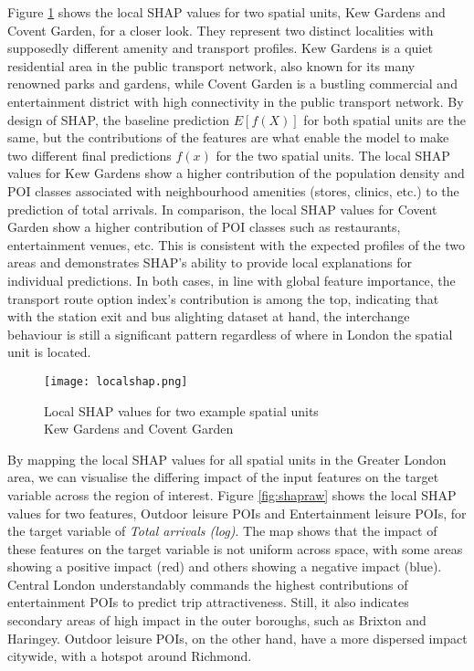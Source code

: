 Figure \ref{fig:localshap} shows the local SHAP values for two spatial units, Kew Gardens and Covent Garden, for a closer look. They represent two distinct localities with supposedly different amenity and transport profiles. Kew Gardens is a quiet residential area in the public transport network, also known for its many renowned parks and gardens, while Covent Garden is a bustling commercial and entertainment district with high connectivity in the public transport network. By design of SHAP, the baseline prediction $E[f(X)]$ for both spatial units are the same, but the contributions of the features are what enable the model to make two different final predictions $f(x)$ for the two spatial units. The local SHAP values for Kew Gardens show a higher contribution of the population density and POI classes associated with neighbourhood amenities (stores, clinics, etc.) to the prediction of total arrivals. In comparison, the local SHAP values for Covent Garden show a higher contribution of POI classes such as restaurants, entertainment venues, etc. This is consistent with the expected profiles of the two areas and demonstrates SHAP's ability to provide local explanations for individual predictions. In both cases, in line with global feature importance, the transport route option index's contribution is among the top, indicating that with the station exit and bus alighting dataset at hand, the interchange behaviour is still a significant pattern regardless of where in London the spatial unit is located.

\begin{figure}[!ht]
    \centering
    \texttt{[image: localshap.png]}
    \captionsetup{justification=centering}
    \caption{Local SHAP values for two example spatial units\\Kew Gardens and Covent Garden}
    \label{fig:localshap}
\end{figure}

By mapping the local SHAP values for all spatial units in the Greater London area, we can visualise the differing impact of the input features on the target variable across the region of interest. Figure \ref{fig:shapraw} shows the local SHAP values for two features, Outdoor leisure POIs and Entertainment leisure POIs, for the target variable of \textit{Total arrivals (log)}. The map shows that the impact of these features on the target variable is not uniform across space, with some areas showing a positive impact (red) and others showing a negative impact (blue). Central London understandably commands the highest contributions of entertainment POIs to predict trip attractiveness. Still, it also indicates secondary areas of high impact in the outer boroughs, such as Brixton and Haringey. Outdoor leisure POIs, on the other hand, have a more dispersed impact citywide, with a hotspot around Richmond. 

